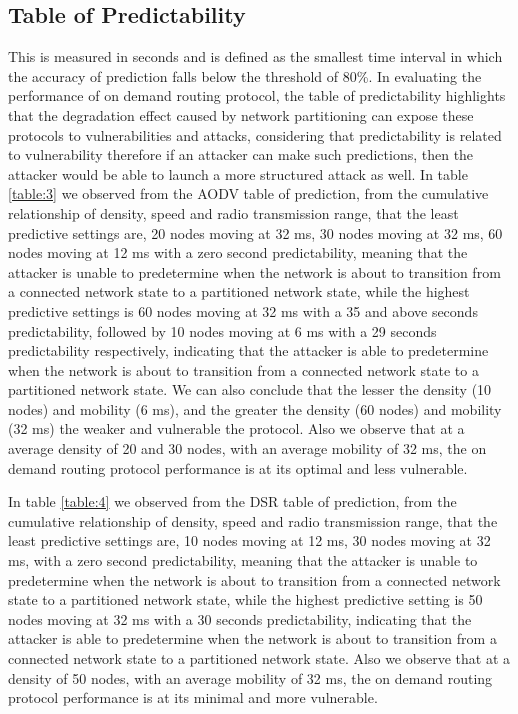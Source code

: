 \documentclass[letterpaper, 10 pt, conference]{ieeeconf}  %
\begin{document}
\subsection{Table of Predictability}
This is measured in seconds and is defined as the smallest time interval in which the accuracy of prediction falls below the threshold of 80\%. In evaluating the performance of on demand routing protocol, the table of predictability highlights that the degradation effect caused by network partitioning can expose these protocols to vulnerabilities and attacks, considering that predictability is related to vulnerability therefore if an attacker can make such predictions, then the attacker would be able to launch a more structured attack as well. In table \ref{table:3} we observed from the AODV table of prediction, from the cumulative relationship of density, speed and radio transmission range, that the least predictive settings are, 20 nodes moving at 32 ms, 30 nodes moving at 32 ms, 60 nodes moving at 12 ms with a zero second predictability, meaning that the attacker is unable to predetermine when the network is about to transition from a connected network state to a partitioned network state, while the highest predictive settings is 60 nodes moving at 32 ms with a 35 and above seconds predictability, followed by 10 nodes moving at 6 ms with a 29 seconds predictability respectively, indicating that the attacker is able to predetermine when the network is about to transition from a connected network state to a partitioned network state. We can also conclude that the lesser the density (10 nodes) and mobility (6 ms), and the greater the density (60 nodes) and mobility (32 ms) the weaker and vulnerable the protocol. Also we observe that at a average density of 20 and 30 nodes, with an average mobility of 32 ms, the on demand routing protocol performance is at its optimal and less vulnerable.


In table \ref{table:4} we observed from the DSR table of prediction, from the cumulative relationship of density, speed and radio transmission range, that the least predictive settings are, 10 nodes moving at 12 ms, 30 nodes moving at 32 ms, with a zero second predictability, meaning that the attacker is unable to predetermine when the network is about to transition from a connected network state to a partitioned network state, while the highest predictive setting is 50 nodes moving at 32 ms with a 30 seconds predictability, indicating that the attacker is able to predetermine when the network is about to transition from a connected network state to a partitioned network state.  Also we observe that at a density of 50 nodes, with an average mobility of 32 ms, the on demand routing protocol performance is at its minimal and more vulnerable.
\end{document}
